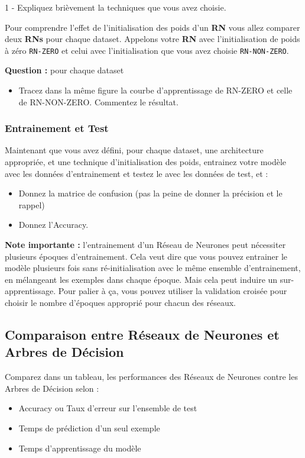 \documentclass[latter,12pt]{article}
\begin{document}
1 - Expliquez brièvement la techniques que vous avez choisie.

Pour comprendre l'effet de l'initialisation des poids d'un \textbf{RN} vous allez comparer deux \textbf{RNs} pour chaque dataset. Appelons votre \textbf{RN} avec l'initialisation de poids à zéro \verb!RN-ZERO! et celui avec l'initialisation que vous avez choisie \verb!RN-NON-ZERO!.

\textbf{Question :} pour chaque dataset
\begin{itemize}
\item Tracez dans la même figure la courbe d'apprentissage de RN-ZERO et celle de RN-NON-ZERO. Commentez le résultat.
\end{itemize}

\subsubsection{Entrainement et Test}
Maintenant que vous avez défini, pour chaque dataset, une architecture appropriée, et une technique d'initialisation des poids, entrainez votre modèle avec les données d'entrainement et testez le avec les données de test, et :
\begin{itemize}
\item Donnez la matrice de confusion (pas la peine de donner la précision et le rappel)
\item Donnez l'Accuracy.
\end{itemize}

\vspace{3mm}
\textbf{Note importante : } l'entrainement d'un Réseau de Neurones peut nécessiter plusieurs époques d'entrainement. Cela veut dire que vous pouvez entrainer le modèle plusieurs fois sans ré-initialisation avec le même ensemble d'entrainement, en mélangeant les exemples dans chaque époque. Mais cela peut induire un sur-apprentissage. Pour palier à ça, vous pouvez utiliser la validation croisée pour choisir le nombre d'époques approprié pour chacun des réseaux.


\subsection{Comparaison entre Réseaux de Neurones et Arbres de Décision}
\label{2.3}
Comparez dans un tableau, les performances des Réseaux de Neurones contre les Arbres de Décision selon :
\begin{itemize}
\item Accuracy ou Taux d'erreur sur l'ensemble de test
\item Temps de prédiction d'un seul exemple
\item Temps d'apprentissage du modèle
\end{itemize} 
\end{document}
